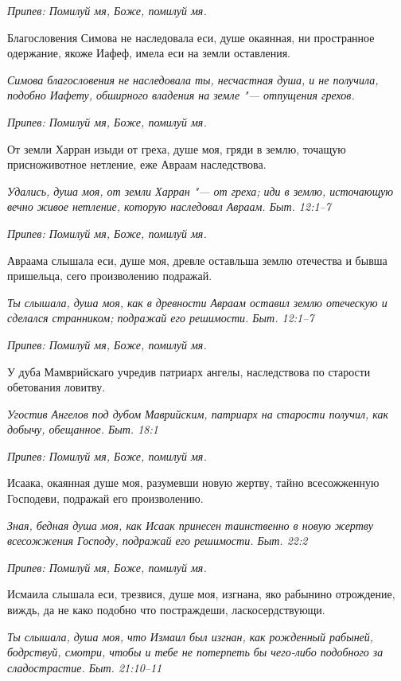 \itshape Припев:\normalfont{} Помилуй мя, Боже, помилуй мя.


Благословения Симова не наследовала еси, душе окаянная, ни пространное одержание, якоже Иафеф, имела еси на земли оставления.


\itshape Симова благословения не наследовала ты, несчастная душа, и не получила, подобно Иафету, обширного владения на земле "--- отпущения грехов.\normalfont{}


\itshape Припев:\normalfont{} Помилуй мя, Боже, помилуй мя.


От земли Харран изыди от греха, душе моя, гряди в землю, точащую присноживотное нетление, еже Авраам наследствова.


\itshape Удались, душа моя, от земли Харран "--- от греха; иди в землю, источающую вечно живое нетление, которую наследовал Авраам. Быт. 12:1–7\normalfont{}


\itshape Припев:\normalfont{} Помилуй мя, Боже, помилуй мя.


Авраама слышала еси, душе моя, древле оставльша землю отечества и бывша пришельца, сего произволению подражай.


\itshape Ты слышала, душа моя, как в древности Авраам оставил землю отеческую и сделался странником; подражай его решимости. Быт. 12:1–7\normalfont{}


\itshape Припев:\normalfont{} Помилуй мя, Боже, помилуй мя.


У дуба Мамврийскаго учредив патриарх ангелы, наследствова по старости обетования ловитву.


\itshape Угостив Ангелов под дубом Маврийским, патриарх на старости получил, как добычу, обещанное. Быт. 18:1\normalfont{}


\itshape Припев:\normalfont{} Помилуй мя, Боже, помилуй мя.


Исаака, окаянная душе моя, разумевши новую жертву, тайно всесожженную Господеви, подражай его произволению.


\itshape Зная, бедная душа моя, как Исаак принесен таинственно в новую жертву всесожжения Господу, подражай его решимости. Быт. 22:2\normalfont{}


\itshape Припев:\normalfont{} Помилуй мя, Боже, помилуй мя.


Исмаила слышала еси, трезвися, душе моя, изгнана, яко рабынино отрождение, виждь, да не како подобно что постраждеши, ласкосердствующи.


\itshape Ты слышала, душа моя, что Измаил был изгнан, как рожденный рабыней, бодрствуй, смотри, чтобы и тебе не потерпеть бы чего-либо подобного за сладострастие. Быт. 21:10–11\normalfont{}


